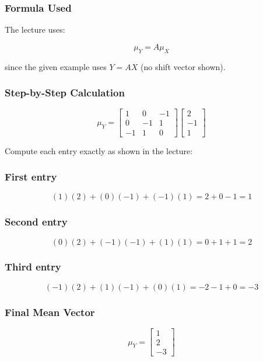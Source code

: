 \documentclass[12pt]{article}
\begin{document}
\subsubsection*{Formula Used}

The lecture uses:

\[
\mu_Y = A\mu_X
\]

since the given example uses \(Y = AX\) (no shift vector shown).

\subsubsection*{Step-by-Step Calculation}

\[
\mu_Y =
\begin{bmatrix}
1 & 0 & -1 \\
0 & -1 & 1 \\
-1 & 1 & 0
\end{bmatrix}
\begin{bmatrix}
2 \\
-1 \\
1
\end{bmatrix}
\]

Compute each entry exactly as shown in the lecture:

\subsubsection*{First entry}

\[
(1)(2) + (0)(-1) + (-1)(1) = 2 + 0 - 1 = 1
\]

\subsubsection*{Second entry}

\[
(0)(2) + (-1)(-1) + (1)(1) = 0 + 1 + 1 = 2
\]

\subsubsection*{Third entry}

\[
(-1)(2) + (1)(-1) + (0)(1) = -2 - 1 + 0 = -3
\]

\subsubsection*{Final Mean Vector}

\[
\boxed{
\mu_Y =
\begin{bmatrix}
1 \\
2 \\
-3
\end{bmatrix}}
\]
\end{document}
